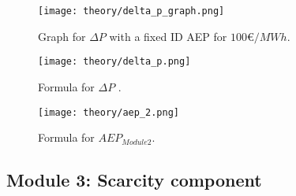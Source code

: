 \documentclass[class=scrbook, crop=false]{standalone}
\begin{document}


 \begin{figure}[ht]
            \centering
            \texttt{[image: theory/delta\_p\_graph.png]}
             \caption[Graph for $\Delta P$ with a fixed ID AEP for $100€/MWh$]{Graph for $\Delta P$ with a fixed ID AEP for $100€/MWh$.}
            \label{fig::delta_p_graph}
 \end{figure}

 \begin{figure}[ht]
            \centering
            \texttt{[image: theory/delta\_p.png]}
             \caption[Formula for$ \Delta P$]{Formula for $\Delta P$ .}
            \label{fig::delta_p}
 \end{figure}
  \begin{figure}[ht]
            \centering
            \texttt{[image: theory/aep\_2.png]}
             \caption[Formula for $AEP_{Module 2}$]{Formula for $AEP_{Module 2}$.}
            \label{fig::aep2}
 \end{figure}

\subsection{Module 3: Scarcity component}
\end{document}
